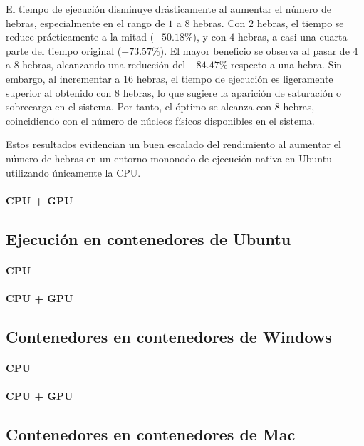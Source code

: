 El tiempo de ejecución disminuye drásticamente al aumentar el número de hebras, especialmente en el rango de $1$ a $8$ hebras. Con $2$ hebras, el tiempo se reduce prácticamente a la mitad ($-50.18\%$), y con $4$ hebras, a casi una cuarta parte del tiempo original ($-73.57\%$). El mayor beneficio se observa al pasar de $4$ a $8$ hebras, alcanzando una reducción del $-84.47\%$ respecto a una hebra. Sin embargo, al incrementar a $16$ hebras, el tiempo de ejecución es ligeramente superior al obtenido con $8$ hebras, lo que sugiere la aparición de saturación o sobrecarga en el sistema. Por tanto, el óptimo se alcanza con $8$ hebras, coincidiendo con el número de núcleos físicos disponibles en el sistema.

Estos resultados evidencian un buen escalado del rendimiento al aumentar el número de hebras en un entorno mononodo de ejecución nativa en Ubuntu utilizando únicamente la CPU.

\paragraph{CPU + GPU}

\subsection{Ejecución en contenedores de Ubuntu}
\paragraph{CPU}

\paragraph{CPU + GPU}

\subsection{Contenedores en contenedores de Windows}
\paragraph{CPU}

\paragraph{CPU + GPU}

\subsection{Contenedores en contenedores de Mac}
